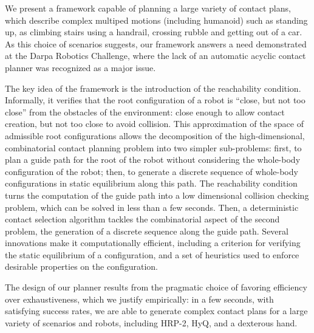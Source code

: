 We present a framework capable of planning 
a large variety of contact plans, which describe complex multiped
motions (including humanoid) such as standing up, as climbing stairs using a handrail, crossing rubble and getting out of a car.
As this choice of scenarios suggests, our framework answers a need demonstrated at the Darpa Robotics Challenge,
where the lack of an automatic acyclic contact planner was recognized as a major issue. 

The key idea of the framework is the introduction of the reachability condition.
Informally, it verifies that the root configuration of a robot is ``close, but not too close'' from the obstacles of the environment: 
close enough to allow contact creation, but not too close to avoid collision.
This approximation of the space of admissible root configurations allows the decomposition of the high-dimensional, combinatorial contact planning problem into two simpler sub-problems:
first, to plan a guide path for the root of the robot without considering the whole-body configuration	 of the robot; then, to generate a discrete sequence of whole-body configurations in static equilibrium along this path. The reachability condition turns the computation of the guide path into a low dimensional collision checking problem, which can be solved in less than a few seconds.
Then, a deterministic contact selection algorithm tackles the combinatorial aspect of the second problem, the generation of a discrete sequence along the guide path.
Several innovations make it computationally efficient, including a criterion for verifying the static equilibrium of a configuration, and a set of heuristics used 
to enforce desirable properties on the configuration.

The design of our planner results from the pragmatic choice of favoring efficiency over exhaustiveness, which we justify empirically:
in a few seconds, with satisfying success rates, we are able to generate complex contact plans for a large variety of scenarios and robots, including HRP-2, HyQ, and a dexterous hand.
